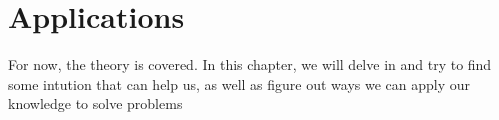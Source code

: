 \section{Applications}\par
\noindent For now, the theory is covered. In this chapter, we will delve in and try to find some intution that can help us, as well as figure out ways we can apply our knowledge to solve problems
\par\bigskip
